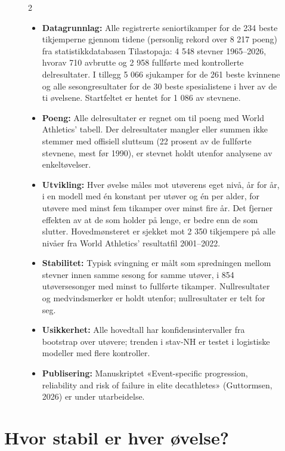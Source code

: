 \begin{figure}[t]
\begin{faktaboks}
\begin{multicols}{2}

\begin{itemize}
\tightlist
\item
  \textbf{Datagrunnlag:} Alle registrerte seniortikamper for de 234 beste tikjemperne gjennom tidene (personlig rekord over 8 217 poeng) fra statistikkdatabasen Tilastopaja: 4 548 stevner 1965--2026, hvorav 710 avbrutte og 2 958 fullførte med kontrollerte delresultater. I tillegg 5 066 sjukamper for de 261 beste kvinnene og alle sesongresultater for de 30 beste spesialistene i hver av de ti øvelsene. Startfeltet er hentet for 1 086 av stevnene.
\item
  \textbf{Poeng:} Alle delresultater er regnet om til poeng med World Athletics' tabell. Der delresultater mangler eller summen ikke stemmer med offisiell sluttsum (22 prosent av de fullførte stevnene, mest før 1990), er stevnet holdt utenfor analysene av enkeltøvelser.
\item
  \textbf{Utvikling:} Hver øvelse måles mot utøverens eget nivå, år for år, i en modell med én konstant per utøver og én per alder, for utøvere med minst fem tikamper over minst fire år. Det fjerner effekten av at de som holder på lenge, er bedre enn de som slutter. Hovedmønsteret er sjekket mot 2 350 tikjempere på alle nivåer fra World Athletics' resultatfil 2001--2022.
\item
  \textbf{Stabilitet:} Typisk svingning er målt som spredningen mellom stevner innen samme sesong for samme utøver, i 854 utøversesonger med minst to fullførte tikamper. Nullresultater og medvindsmerker er holdt utenfor; nullresultater er telt for seg.
\item
  \textbf{Usikkerhet:} Alle hovedtall har konfidensintervaller fra bootstrap over utøvere; trenden i stav-NH er testet i logistiske modeller med flere kontroller.
\item
  \textbf{Publisering:} Manuskriptet «Event-specific progression, reliability and risk of failure in elite decathletes» (Guttormsen, 2026) er under utarbeidelse.
\end{itemize}

\end{multicols}
\end{faktaboks}
\end{figure}

\section{Hvor stabil er hver øvelse?}\label{hvor-stabil-er-hver-uxf8velse}

